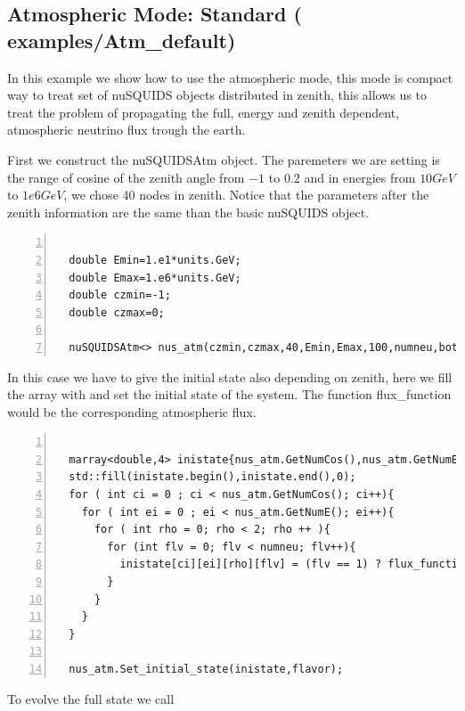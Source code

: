 \subsection{Atmospheric Mode: Standard \textnormal{({\ttf
      examples/Atm\_default})}}
In this example we show how to use the atmospheric mode, this mode is
compact way to treat set of nuSQUIDS objects distributed in zenith, this
allows us to treat the problem of
propagating the full, energy and zenith dependent, atmospheric neutrino flux trough the earth.

First we construct the nuSQUIDSAtm object. The paremeters we are
setting is the range of cosine of the zenith angle from $-1$ to $0.2$
and in energies from $10GeV$ to $1e6GeV$, we chose 40 nodes in zenith.
Notice that the parameters after the zenith information are the same
than the basic nuSQUIDS object.

\begin{lstlisting}[frame=leftline, numbers =
  left,breaklines=true,label = ex:sin1]

  double Emin=1.e1*units.GeV;
  double Emax=1.e6*units.GeV;
  double czmin=-1;
  double czmax=0;

  nuSQUIDSAtm<> nus_atm(czmin,czmax,40,Emin,Emax,100,numneu,both,true,interactions);

\end{lstlisting}

In this case we have to give the initial state also depending on
zenith, here we fill the array with and set the initial state of the
system. The function {\ttf flux\_function} would be the corresponding
atmospheric flux.

\begin{lstlisting}[frame=leftline, numbers =
  left,breaklines=true,label = ex:sin1,firstnumber=last]

  marray<double,4> inistate{nus_atm.GetNumCos(),nus_atm.GetNumE(),2,numneu};
  std::fill(inistate.begin(),inistate.end(),0);
  for ( int ci = 0 ; ci < nus_atm.GetNumCos(); ci++){
    for ( int ei = 0 ; ei < nus_atm.GetNumE(); ei++){
      for ( int rho = 0; rho < 2; rho ++ ){
        for (int flv = 0; flv < numneu; flv++){
          inistate[ci][ei][rho][flv] = (flv == 1) ? flux_function(e_range[ei], cz_range[ci]) : 0.0;//set 1 only to the muon flavor
        }
      }
    }
  }

  nus_atm.Set_initial_state(inistate,flavor);

\end{lstlisting}


To evolve the full state we call

